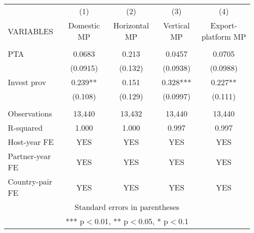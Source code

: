 \begin{tabular}{lcccc} \hline
 & (1) & (2) & (3) & (4) \\
VARIABLES & Domestic MP & Horizontal MP & Vertical MP & Export-platform MP \\ \hline
 &  &  &  &  \\
PTA & 0.0683 & 0.213 & 0.0457 & 0.0705 \\
 & (0.0915) & (0.132) & (0.0938) & (0.0988) \\
Invest prov & 0.239** & 0.151 & 0.328*** & 0.227** \\
 & (0.108) & (0.129) & (0.0997) & (0.111) \\
 &  &  &  &  \\
Observations & 13,440 & 13,432 & 13,440 & 13,440 \\
R-squared & 1.000 & 1.000 & 0.997 & 0.997 \\
Host-year FE & YES & YES & YES & YES \\
Partner-year FE & YES & YES & YES & YES \\
 Country-pair FE & YES & YES & YES & YES \\ \hline
\multicolumn{5}{c}{ Standard errors in parentheses} \\
\multicolumn{5}{c}{ *** p$<$0.01, ** p$<$0.05, * p$<$0.1} \\
\end{tabular}
